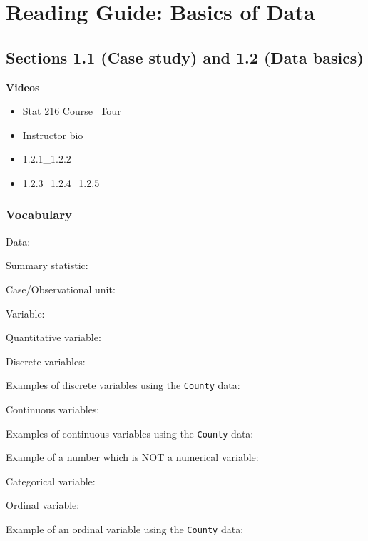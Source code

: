 \documentclass[
]{report}
\providecommand{\tightlist}{%
  \setlength{\itemsep}{0pt}\setlength{\parskip}{0pt}}
\newcommand{\rgs}{\vspace{12pt}} %
\newcommand{\rgi}{\hspace{24pt}}  %
\begin{document}
\hypertarget{reading-guide-basics-of-data}{%
\section{Reading Guide: Basics of Data}\label{reading-guide-basics-of-data}}

\hypertarget{sections-1.1-case-study-and-1.2-data-basics}{%
\subsection*{Sections 1.1 (Case study) and 1.2 (Data basics)}\label{sections-1.1-case-study-and-1.2-data-basics}}

\textbf{Videos}

\begin{itemize}
\tightlist
\item
  Stat 216 Course\_Tour
\item
  Instructor bio
\item
  1.2.1\_1.2.2
\item
  1.2.3\_1.2.4\_1.2.5
\end{itemize}


\hypertarget{vocabulary}{%
\subsubsection*{Vocabulary}\label{vocabulary}}

Data:
\rgs

Summary statistic:
\rgs

Case/Observational unit:
\rgs

Variable:
\rgs

\rgi Quantitative variable:
\rgs

\rgi Discrete variables:
\rgs

\rgi \rgi Examples of discrete variables using the \texttt{County} data:
\rgs

\rgi Continuous variables:
\rgs

\rgi \rgi Examples of continuous variables using the \texttt{County} data:
\rgs

Example of a number which is NOT a numerical variable:
\rgs

Categorical variable:
\rgs

\rgi Ordinal variable:
\rgs

\rgi \rgi Example of an ordinal variable using the \texttt{County} data:
\rgs
\end{document}
